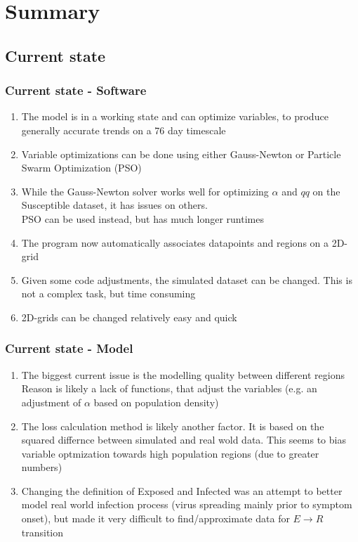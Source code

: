 \documentclass{beamer}
\begin{document}
\section{Summary}
\subsection{Current state}
\begin{frame}
	\frametitle{Current state - Software}
	\begin{enumerate}[$\bullet$]
		\item The model is in a working state and can optimize variables, to produce generally accurate trends on a 76 day timescale
		\item Variable optimizations can be done using either Gauss-Newton or Particle Swarm Optimization (PSO)
		\item While the Gauss-Newton solver works well for optimizing $\alpha$ and $qq$ on the Susceptible dataset, it has issues on others.\\
			PSO can be used instead, but has much longer runtimes
		\item The program now automatically associates datapoints and regions on a 2D-grid
		\item Given some code adjustments, the simulated dataset can be changed. This is not a complex task, but time consuming
		\item 2D-grids can be changed relatively easy and quick
	\end{enumerate}
\end{frame}

\begin{frame}
	\frametitle{Current state - Model}
	\label{sec:StateModel}
	\begin{enumerate}[$\bullet$]
		\item The biggest current issue is the modelling quality between different regions\\
			Reason is likely a lack of functions, that adjust the variables (e.g. an adjustment of $\alpha$ based on population density)
		\item The loss calculation method is likely another factor. It is based on the squared differnce between simulated
			and real wold data. This seems to bias variable optmization towards high population regions (due to greater numbers)
		\item Changing the definition of Exposed and Infected was an attempt to better model real world infection process (virus spreading mainly
			prior to symptom onset), but made it very difficult to find/approximate data for $E\rightarrow R$ transition
	\end{enumerate}
\end{frame}
\end{document}

